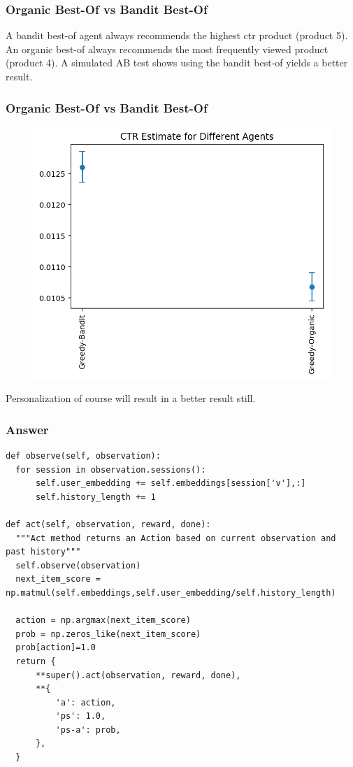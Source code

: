 \begin{frame}
\frametitle{Organic Best-Of vs Bandit Best-Of}

A bandit best-of agent always recommends the highest ctr product (product 5).  An organic best-of always recommends the most frequently viewed product (product 4).  A simulated AB test shows using the bandit best-of yields a better result.

\end{frame}

\begin{frame}
\frametitle{Organic Best-Of vs Bandit Best-Of}
  
\begin{figure}[h!]
\includegraphics[scale=0.4]{images/bestof.png}
\centering
\label{motex1}
\end{figure}

\pause
Personalization of course will result in a better result still.
\end{frame}





\begin{frame}[fragile]
  \frametitle{Answer}
\begin{tiny}  
\begin{verbatim}
def observe(self, observation):
  for session in observation.sessions():
      self.user_embedding += self.embeddings[session['v'],:]
      self.history_length += 1

def act(self, observation, reward, done):
  """Act method returns an Action based on current observation and past history"""
  self.observe(observation)
  next_item_score = np.matmul(self.embeddings,self.user_embedding/self.history_length)

  action = np.argmax(next_item_score)        
  prob = np.zeros_like(next_item_score)
  prob[action]=1.0
  return {
      **super().act(observation, reward, done),
      **{
          'a': action,
          'ps': 1.0,
          'ps-a': prob,
      },
  }
\end{verbatim}
\end{tiny}
\end{frame}

